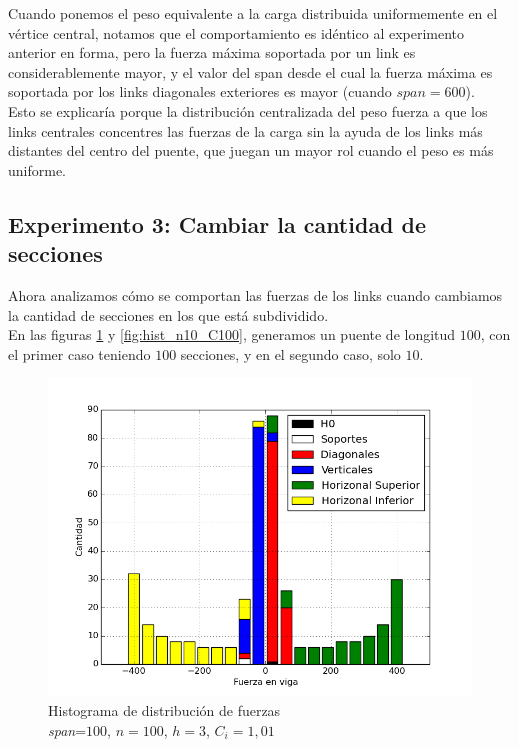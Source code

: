 Cuando ponemos el peso equivalente a la carga distribuida uniformemente en el
vértice central, notamos que el comportamiento es idéntico al experimento
anterior en forma, pero la fuerza máxima soportada por un link es considerablemente mayor, y el valor del span desde el cual la fuerza máxima es soportada por los links diagonales exteriores es mayor (cuando $span = 600$).\\

Esto se explicaría porque la distribución centralizada del peso fuerza a que los links centrales concentres las fuerzas de la carga sin la ayuda de los links más distantes del centro del puente, que juegan un mayor rol cuando el peso es más uniforme.

\newpage
\subsection{Experimento 3: Cambiar la cantidad de secciones}

Ahora analizamos cómo se comportan las fuerzas de los links cuando cambiamos la cantidad de secciones en los que está subdividido.\\

En las figuras \ref{fig:hist_n100_C100} y \ref{fig:hist_n10_C100}, generamos un puente de longitud $100$, con el primer caso teniendo $100$ secciones, y en el segundo caso, solo $10$.

\begin{figure}[h!]
\begin{center}
\includegraphics[scale=0.5]{archivos/graficos/hist_n100_C100.png}
\caption{\label{fig:hist_n100_C100}Histograma de distribución de fuerzas\\
\textit{span}=$100$, $n=100$, $h=3$, $C_i=1,01$}
\end{center}
\end{figure}

